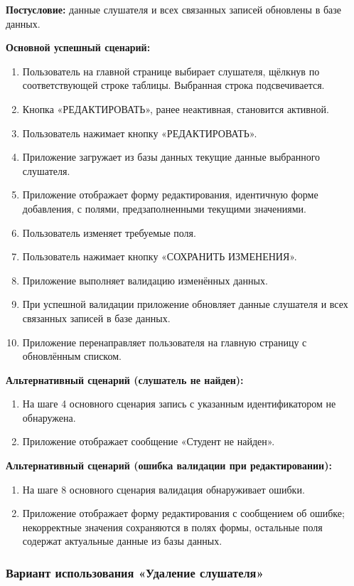 \textbf{Постусловие:} данные слушателя и всех связанных записей обновлены в базе данных.

\textbf{Основной успешный сценарий:}
\begin{enumerate}
	\item Пользователь на главной странице выбирает слушателя, щёлкнув по соответствующей строке таблицы. Выбранная строка подсвечивается.
	\item Кнопка «РЕДАКТИРОВАТЬ», ранее неактивная, становится активной.
	\item Пользователь нажимает кнопку «РЕДАКТИРОВАТЬ».
	\item Приложение загружает из базы данных текущие данные выбранного слушателя.
	\item Приложение отображает форму редактирования, идентичную форме добавления, с полями, предзаполненными текущими значениями.
	\item Пользователь изменяет требуемые поля.
	\item Пользователь нажимает кнопку «СОХРАНИТЬ ИЗМЕНЕНИЯ».
	\item Приложение выполняет валидацию изменённых данных.
	\item При успешной валидации приложение обновляет данные слушателя и всех связанных записей в базе данных.
	\item Приложение перенаправляет пользователя на главную страницу с обновлённым списком.
\end{enumerate}

\textbf{Альтернативный сценарий (слушатель не найден):}
\begin{enumerate}
	\item На шаге 4 основного сценария запись с указанным идентификатором не обнаружена.
	\item Приложение отображает сообщение «Студент не найден».
\end{enumerate}

\textbf{Альтернативный сценарий (ошибка валидации при редактировании):}
\begin{enumerate}
	\item На шаге 8 основного сценария валидация обнаруживает ошибки.
	\item Приложение отображает форму редактирования с сообщением об ошибке; некорректные значения сохраняются в полях формы, остальные поля содержат актуальные данные из базы данных.
\end{enumerate}

\subsubsection{Вариант использования «Удаление слушателя»}

